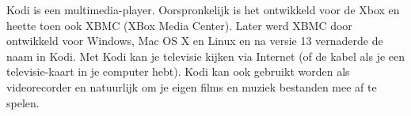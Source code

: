 Kodi is een multimedia-player. Oorspronkelijk is het ontwikkeld voor de Xbox en heette toen ook XBMC (XBox Media Center). Later werd XBMC door ontwikkeld voor Windows, Mac OS X en Linux en na versie 13 vernaderde de naam in Kodi. Met Kodi kan je televisie kijken via Internet (of de kabel als je een televisie-kaart in je computer hebt). Kodi kan ook gebruikt worden als videorecorder en natuurlijk om je eigen films en muziek bestanden mee af te spelen.

